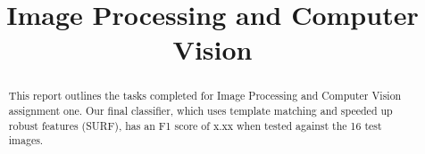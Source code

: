 \documentclass[conference]{IEEEtran}
\begin{document}
\title{Image Processing and Computer Vision\\
}
\author{
\and
{}
}


\maketitle

\begin{abstract}
This report outlines the tasks completed for Image Processing and Computer Vision assignment one. Our final classifier, which uses template matching and speeded up robust features (SURF), has an F1 score of x.xx when tested against the 16 test images. 
\end{abstract}
\end{document}
